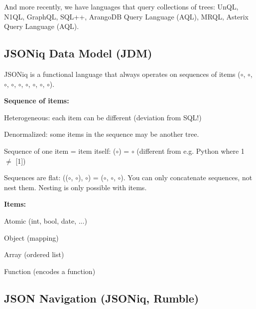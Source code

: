 \documentclass[11pt,oneside,a4paper]{article}
\begin{document}
{And more recently, we have languages that query collections of trees: UnQL, N1QL, GraphQL, SQL++, ArangoDB Query Language (AQL), MRQL, Asterix Query Language (AQL).


\subsection{JSONiq Data Model (JDM)}

JSONiq is a functional language that always operates on sequences of items ($\circ$, $\circ$, $\circ$, $\circ$, $\circ$, $\circ$, $\circ$, $\circ$, $\circ$).

\textbf{Sequence of items:}

\begin{compactitem}
\item Heterogeneous: each item can be different (deviation from SQL!)
\item Denormalized: some items in the sequence may be another tree.
\item Sequence of one item = item itself: ($\circ$) = $\circ$ (different from e.g. Python where 1 $\neq$ [1])
\item Sequences are flat: (($\circ$, $\circ$), $\circ$) = ($\circ$, $\circ$, $\circ$). You can only concatenate sequences, not nest them. Nesting is only possible with items.
\end{compactitem}

\textbf{Items:}

\begin{compactitem}
\item Atomic (int, bool, date, ...)
\item Object (mapping)
\item Array (ordered list)
\item Function (encodes a function)
\end{compactitem}

\newpage

\subsection{JSON Navigation (JSONiq, Rumble)}

}
\end{document}
